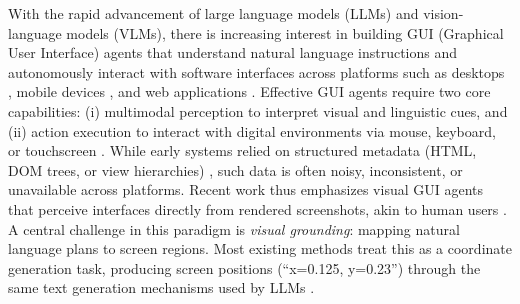 

With the rapid advancement of large language models (LLMs) and vision-language models (VLMs), there is increasing interest in building GUI (Graphical User Interface) agents that understand natural language instructions and autonomously interact with software interfaces across platforms such as desktops \cite{zhang2024ufo, zhang2025ufo2}, mobile devices \cite{wang2024mobileagentautonomousmultimodalmobile}, and web applications \cite{zheng2024gpt}. Effective GUI agents require two core capabilities: (i) multimodal perception to interpret visual and linguistic cues, and (ii) action execution to interact with digital environments via mouse, keyboard, or touchscreen \cite{zhang2024large, wang2024large}. While early systems relied on structured metadata (\eg HTML, DOM trees, or view hierarchies) \cite{zhang2024ufo}, such data is often noisy, inconsistent, or unavailable across platforms. Recent work thus emphasizes visual GUI agents that perceive interfaces directly from rendered screenshots, akin to human users \cite{xu2024aguvis}. A central challenge in this paradigm is \emph{visual grounding}: mapping natural language plans to screen regions. Most existing methods treat this as a coordinate generation task, producing screen positions (\eg ``x=0.125, y=0.23'') through the same text generation mechanisms used by LLMs \cite{gou2024navigating}.

